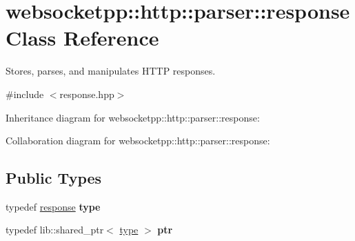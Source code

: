 \hypertarget{classwebsocketpp_1_1http_1_1parser_1_1response}{}\section{websocketpp\+:\+:http\+:\+:parser\+:\+:response Class Reference}
\label{classwebsocketpp_1_1http_1_1parser_1_1response}


Stores, parses, and manipulates H\+T\+TP responses.  




{\ttfamily \#include $<$response.\+hpp$>$}



Inheritance diagram for websocketpp\+:\+:http\+:\+:parser\+:\+:response\+:


Collaboration diagram for websocketpp\+:\+:http\+:\+:parser\+:\+:response\+:
\subsection*{Public Types}
\begin{DoxyCompactItemize}
\item 
\mbox{\label{classwebsocketpp_1_1http_1_1parser_1_1response_ac8666204343c97725f35fd1aa8573c2b}} 
typedef \mbox{\hyperlink{classwebsocketpp_1_1http_1_1parser_1_1response}{response}} {\bfseries type}
\item 
\mbox{\label{classwebsocketpp_1_1http_1_1parser_1_1response_a4072a02adfa5e60b4e23246d561d9c25}} 
typedef lib\+::shared\+\_\+ptr$<$ \mbox{\hyperlink{classwebsocketpp_1_1http_1_1parser_1_1response}{type}} $>$ {\bfseries ptr}
\end{DoxyCompactItemize}
